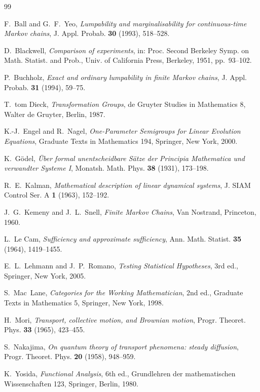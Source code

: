 \documentclass[11pt,reqno]{amsart}
\theoremstyle{plain}
\theoremstyle{definition}
\theoremstyle{remark}
\begin{document}
\begin{thebibliography}{99}

F.~Ball and G.~F.~Yeo,
\emph{Lumpability and marginalisability for continuous-time Markov chains},
J. Appl. Probab. \textbf{30} (1993), 518--528.

D.~Blackwell,
\emph{Comparison of experiments},
in: Proc. Second Berkeley Symp. on Math. Statist. and Prob., Univ. of California Press, Berkeley, 1951, pp.~93--102.

P.~Buchholz,
\emph{Exact and ordinary lumpability in finite Markov chains},
J. Appl. Probab. \textbf{31} (1994), 59--75.

T.~tom Dieck,
\emph{Transformation Groups},
de Gruyter Studies in Mathematics 8, Walter de Gruyter, Berlin, 1987.

K.-J.~Engel and R.~Nagel,
\emph{One-Parameter Semigroups for Linear Evolution Equations},
Graduate Texts in Mathematics 194, Springer, New York, 2000.

K.~G\"odel,
\emph{\"Uber formal unentscheidbare S\"atze der Principia Mathematica und verwandter Systeme I},
Monatsh. Math. Phys. \textbf{38} (1931), 173--198.

R.~E.~Kalman,
\emph{Mathematical description of linear dynamical systems},
J. SIAM Control Ser. A \textbf{1} (1963), 152--192.

J.~G.~Kemeny and J.~L.~Snell,
\emph{Finite Markov Chains},
Van Nostrand, Princeton, 1960.

L.~Le Cam,
\emph{Sufficiency and approximate sufficiency},
Ann. Math. Statist. \textbf{35} (1964), 1419--1455.

E.~L.~Lehmann and J.~P.~Romano,
\emph{Testing Statistical Hypotheses}, 3rd ed.,
Springer, New York, 2005.

S.~Mac~Lane,
\emph{Categories for the Working Mathematician}, 2nd ed.,
Graduate Texts in Mathematics 5, Springer, New York, 1998.

H.~Mori,
\emph{Transport, collective motion, and Brownian motion},
Progr. Theoret. Phys. \textbf{33} (1965), 423--455.

S.~Nakajima,
\emph{On quantum theory of transport phenomena: steady diffusion},
Progr. Theoret. Phys. \textbf{20} (1958), 948--959.

K.~Yosida,
\emph{Functional Analysis}, 6th ed.,
Grundlehren der mathematischen Wissenschaften 123, Springer, Berlin, 1980.


\end{thebibliography}
\end{document}
